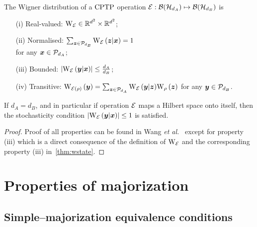 \begin{proposition}
    \label{thm:wchannel}
    The Wigner distribution of a ${\rm{CPTP}}$ operation $\mathcal{E}: \mathcal{B}(\mathcal{H}_{d_A}) \mapsto \mathcal{B}(\mathcal{H}_{d_B})$ is
    \begin{enumerate}
        \item[(i)]\label{en:wo1} Real-valued: $\W{\E} \in \mathbb{R}^{d^2} \times \mathbb{R}^{d^2}$;
        \item[(ii)]\label{en:wo2} Normalised: $\sum_{\bmz \in \cal{P}_{d_B}} \W[\bmz|\bmx]{\E} = 1$ \\ 
        for any $\bm{x} \in \mathcal{P}_{d_A}$;
        \item[(iii)]\label{en:wo3} Bounded: $\abs{\W[\bmy|\bmx]{\E}} \leq \frac{d_A}{d_B}$;
	    \item[(iv)]\label{en:wo4} Transitive: $\W[\bmy]{\E(\rho)} = \sum_{\bmz \in \cal{P}_{d_A}} \W[\bmy|\bmz]{\E} \W[\bmz]{\rho}$ for any $\bm{y} \in \mathcal{P}_{d_B}$.
    \end{enumerate}
\end{proposition}
If $d_A = d_B$, and in particular if operation $\mathcal{E}$ maps a Hilbert space onto itself, then the stochasticity condition $\abs{\W[\bmy|\bmx]{\E}} \leq 1$ is satisfied.
\begin{proof}
	Proof of all properties can be found in Wang \textit{et al.}~\cite{Wang_2019} except for property (iii) which is a direct consequence of the definition of $\W{\E}$ and the corresponding property (iii) in~\cref{thm:wstate}.
\end{proof}


\section{Properties of majorization}
\label{app:major}

\subsection{Simple--majorization equivalence conditions}

